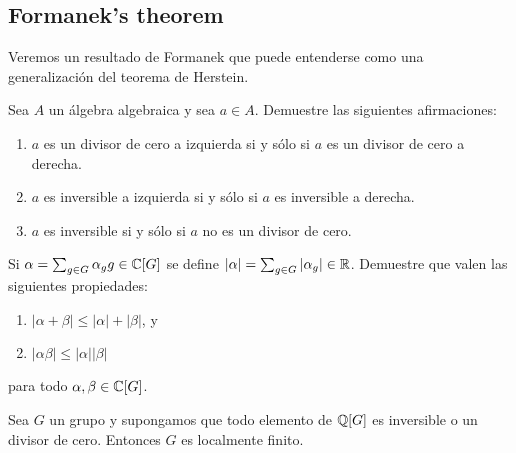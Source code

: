 \begin{exercise}
\section*{Formanek's theorem}

Veremos un resultado de Formanek que puede entenderse como una generalización
del teorema de Herstein. 

\begin{exercise}
	Sea $A$ un álgebra algebraica y sea $a\in A$. Demuestre las siguientes
	afirmaciones:
	\begin{enumerate}
		\item $a$ es un divisor de cero a izquierda si y sólo si $a$ es un
			divisor de cero a derecha.
		\item $a$ es inversible a izquierda si y sólo si $a$ es inversible a
			derecha.
		\item $a$ es inversible si y sólo si $a$ no es un divisor de cero.
	\end{enumerate}
\end{exercise}


\begin{exercise}
	\label{exa:norma}
	Si $\alpha=\sum_{g\in G}\alpha_gg\in\mathbb{C}[G]$ se define $|\alpha|=\sum_{g\in
	G}|\alpha_g|\in\mathbb{R}$. Demuestre que valen las siguientes propiedades:
	\begin{enumerate}
		\item $|\alpha+\beta|\leq|\alpha|+|\beta|$, y 
		\item $|\alpha\beta|\leq|\alpha||\beta|$ 
	\end{enumerate}
	para todo $\alpha,\beta\in\mathbb{C}[G]$.
\end{exercise}

\begin{theorem}
	\label{thm:FormanekQ}
	Sea $G$ un grupo y supongamos que todo elemento de $\mathbb{Q}[G]$ es inversible o
	un divisor de cero. Entonces $G$ es localmente finito.
\end{theorem}


\end{exercise}
